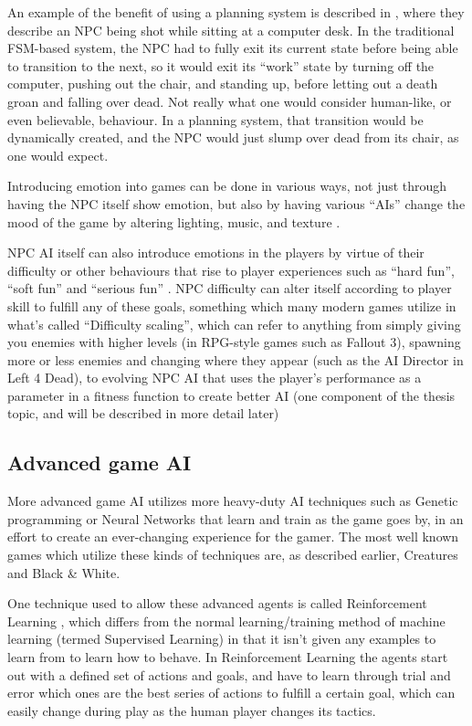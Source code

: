 \documentclass[]{report}
\begin{document}
An example of the benefit of using a planning system is described in
\citet{orkin2006three}, where they describe an NPC being shot while sitting at a
computer desk. In the traditional FSM-based system, the NPC had to fully exit
its current state before being able to transition to the next, so it would exit
its ``work'' state by turning off the computer, pushing out the chair, and
standing up, before letting out a death groan and falling over dead. Not really
what one would consider human-like, or even believable, behaviour. In a planning
system, that transition would be dynamically created, and the NPC would just
slump over dead from its chair, as one would expect.

Introducing emotion into games can be done in various ways, not just through
having the NPC itself show emotion, but also by having various ``AIs'' change
the mood of the game by altering lighting, music, and texture
\citep[chap.~9]{kirby2011introduction}.

NPC AI itself can also introduce emotions in the players by virtue of their
difficulty or other behaviours that rise to player experiences such as ``hard
fun'', ``soft fun'' and ``serious fun'' \citep{lazzaro2004we}. NPC difficulty
can alter itself according to player skill to fulfill any of these goals,
something which many modern games utilize in what's called ``Difficulty
scaling'', which can refer to anything from simply giving you enemies with
higher levels (in RPG-style games such as Fallout 3), spawning more or less
enemies and changing where they appear (such as the AI Director in Left 4 Dead),
to evolving NPC AI that uses the player's performance as a parameter in a
fitness function to create better AI (one component of the thesis topic, and
will be described in more detail later)

\subsection{Advanced game AI}
\label{sec:advanced-game-ai}

More advanced game AI utilizes more heavy-duty AI techniques such as Genetic
programming or Neural Networks that learn and train as the game goes by, in an
effort to create an ever-changing experience for the gamer. The most well known
games which utilize these kinds of techniques are, as described earlier,
Creatures \citep{grand1997creatures} and Black \& White.

One technique used to allow these advanced agents is called Reinforcement
Learning \citep{merrick2006motivated,sutton1998reinforcement}, which differs
from the normal learning/training method of machine learning (termed Supervised
Learning) in that it isn't given any examples to learn from to learn how to
behave. In Reinforcement Learning the agents start out with a defined set of
actions and goals, and have to learn through trial and error which ones are the
best series of actions to fulfill a certain goal, which can easily change during
play as the human player changes its tactics.
\end{document}
